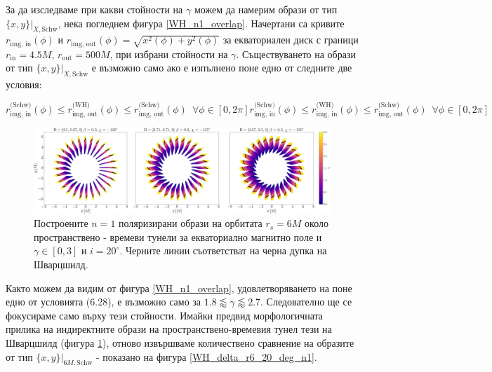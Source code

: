За да изследваме при какви стойности на $\gamma$ можем да намерим образи от тип $\{x,y\}\vert_{X, \text{Schw}}$, нека погледнем фигура \ref{WH_n1_overlap}. Начертани са кривите $r_\text{img, in}(\phi)$ и $r_\text{img, out}(\phi) = \sqrt{x^2(\phi) + y^2(\phi)}$ за екваториален диск с граници $r_\text{in} = 4.5M$, $r_\text{out} = 500M$, при избрани стойности на $\gamma$. Съществуването на образи от тип $\{x,y\}\vert_{X, \text{Schw}}$ е възможно само ако е изпълнено поне едно от следните две условия:


\begin{subequations}
	\begin{equation}
		r_\text{img, in}^{\text{(Schw)}}(\phi) \le r_\text{img, out}^{\text{(WH)}}(\phi) \le r_\text{img, out}^{\text{(Schw)}}(\phi)\,\,\, \forall\phi\in[0,2\pi]
	\end{equation}
	\begin{equation}
		r_\text{img, in}^{\text{(Schw)}}(\phi) \le r_\text{img, in}^{\text{(WH)}}(\phi) \le r_\text{img, out}^{\text{(Schw)}}(\phi)\,\,\, \forall\phi\in[0,2\pi]
	\end{equation}
\end{subequations}
\newpage
\begin{figure}[!htb]
	\hspace{-0.2cm}
	\includegraphics[scale = 0.17]{WH_alpha_Eq_Field_n1.png}
	\caption[Поляризирани $n=1$ образи около пространствено - времеви тунели за екваториално магнитно поле.]{\small Построените $n=1$ поляризирани образи на орбитата $r_s = 6M$ около пространствено - времеви тунели за екваториално магнитно поле и $\gamma \in[0,3]$ и $i = 20^\circ$. Черните линии съответстват на черна дупка на Шварцшилд.} 
	\label{WH_pol_eq_field_n1}
\end{figure}

Както можем да видим от фигура \ref{WH_n1_overlap}, удовлетворяването на поне едно от условията (6.28), е възможно само за  $1.8 \lessapprox \gamma \lessapprox 2.7$. Следователно ще се фокусираме само върху тези стойности. Имайки предвид морфологичната прилика на индиректните образи на пространствено-времевия тунел тези на Шварцшилд (фигура \ref{WH_pol_eq_field_n1}), отново извършваме количествено сравнение на образите от тип $\{x,y\}\vert_{6M, \text{Schw}}$ - показано на фигура \ref{WH_delta_r6_20_deg_n1}.\\

